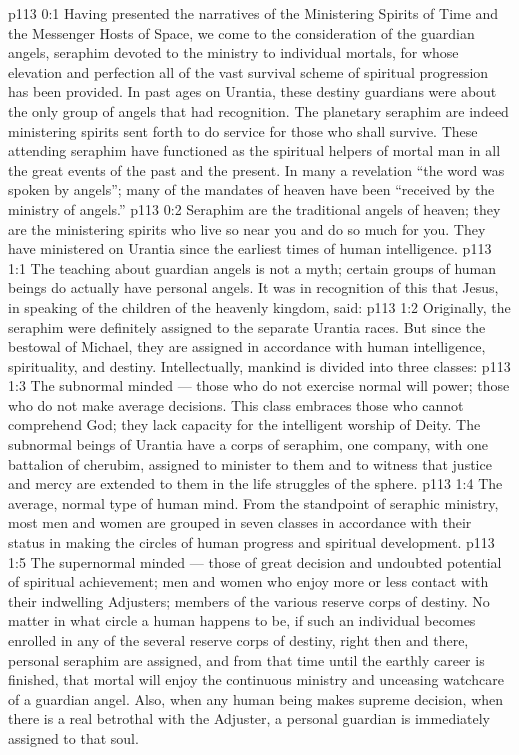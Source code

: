 \author{Chief of Seraphim}
\vs p113 0:1 Having presented the narratives of the Ministering Spirits of Time and the Messenger Hosts of Space, we come to the consideration of the guardian angels, seraphim devoted to the ministry to individual mortals, for whose elevation and perfection all of the vast survival scheme of spiritual progression has been provided. In past ages on Urantia, these destiny guardians were about the only group of angels that had recognition. The planetary seraphim are indeed ministering spirits sent forth to do service for those who shall survive. These attending seraphim have functioned as the spiritual helpers of mortal man in all the great events of the past and the present. In many a revelation “the word was spoken by angels”; many of the mandates of heaven have been “received by the ministry of angels.”
\vs p113 0:2 Seraphim are the traditional angels of heaven; they are the ministering spirits who live so near you and do so much for you. They have ministered on Urantia since the earliest times of human intelligence.
\vs p113 1:1 The teaching about guardian angels is not a myth; certain groups of human beings do actually have personal angels. It was in recognition of this that Jesus, in speaking of the children of the heavenly kingdom, said: 
\vs p113 1:2 Originally, the seraphim were definitely assigned to the separate Urantia races. But since the bestowal of Michael, they are assigned in accordance with human intelligence, spirituality, and destiny. Intellectually, mankind is divided into three classes:
\vs p113 1:3 \bibnobreakspace The subnormal minded --- those who do not exercise normal will power; those who do not make average decisions. This class embraces those who cannot comprehend God; they lack capacity for the intelligent worship of Deity. The subnormal beings of Urantia have a corps of seraphim, one company, with one battalion of cherubim, assigned to minister to them and to witness that justice and mercy are extended to them in the life struggles of the sphere.
\vs p113 1:4 \bibnobreakspace The average, normal type of human mind. From the standpoint of seraphic ministry, most men and women are grouped in seven classes in accordance with their status in making the circles of human progress and spiritual development.
\vs p113 1:5 \bibnobreakspace The supernormal minded --- those of great decision and undoubted potential of spiritual achievement; men and women who enjoy more or less contact with their indwelling Adjusters; members of the various reserve corps of destiny. No matter in what circle a human happens to be, if such an individual becomes enrolled in any of the several reserve corps of destiny, right then and there, personal seraphim are assigned, and from that time until the earthly career is finished, that mortal will enjoy the continuous ministry and unceasing watchcare of a guardian angel. Also, when any human being makes  supreme decision, when there is a real betrothal with the Adjuster, a personal guardian is immediately assigned to that soul.
